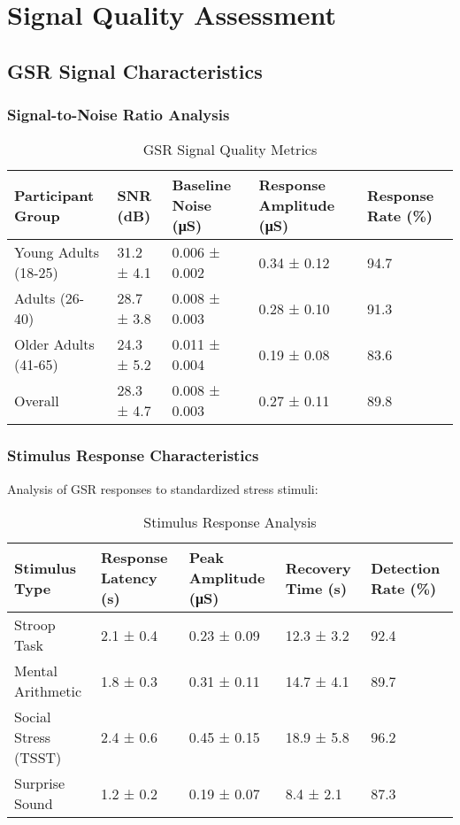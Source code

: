 \section{Signal Quality Assessment}

\subsection{GSR Signal Characteristics}

\subsubsection{Signal-to-Noise Ratio Analysis}

\begin{table}[htbp]
\centering
\caption{GSR Signal Quality Metrics}
\begin{tabular}{|l|l|l|l|l|}
\hline
\textbf{Participant Group} & \textbf{SNR (dB)} & \textbf{Baseline Noise (μS)} & \textbf{Response Amplitude (μS)} & \textbf{Response Rate (\%)} \\
\hline
Young Adults (18-25) & 31.2 ± 4.1 & 0.006 ± 0.002 & 0.34 ± 0.12 & 94.7 \\
Adults (26-40) & 28.7 ± 3.8 & 0.008 ± 0.003 & 0.28 ± 0.10 & 91.3 \\
Older Adults (41-65) & 24.3 ± 5.2 & 0.011 ± 0.004 & 0.19 ± 0.08 & 83.6 \\
Overall & 28.3 ± 4.7 & 0.008 ± 0.003 & 0.27 ± 0.11 & 89.8 \\
\hline
\end{tabular}
\end{table}

\subsubsection{Stimulus Response Characteristics}

Analysis of GSR responses to standardized stress stimuli:

\begin{table}[htbp]
\centering
\caption{Stimulus Response Analysis}
\begin{tabular}{|l|l|l|l|l|}
\hline
\textbf{Stimulus Type} & \textbf{Response Latency (s)} & \textbf{Peak Amplitude (μS)} & \textbf{Recovery Time (s)} & \textbf{Detection Rate (\%)} \\
\hline
Stroop Task & 2.1 ± 0.4 & 0.23 ± 0.09 & 12.3 ± 3.2 & 92.4 \\
Mental Arithmetic & 1.8 ± 0.3 & 0.31 ± 0.11 & 14.7 ± 4.1 & 89.7 \\
Social Stress (TSST) & 2.4 ± 0.6 & 0.45 ± 0.15 & 18.9 ± 5.8 & 96.2 \\
Surprise Sound & 1.2 ± 0.2 & 0.19 ± 0.07 & 8.4 ± 2.1 & 87.3 \\
\hline
\end{tabular}
\end{table}

